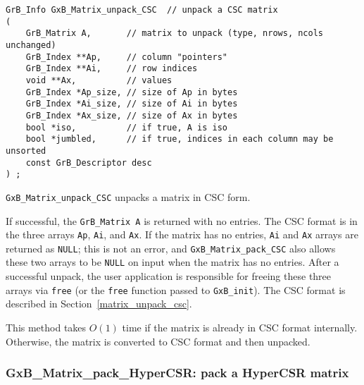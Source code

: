 \documentclass[12pt]{article}
\begin{document}
{\begin{mdframed}[userdefinedwidth=6in]
{\footnotesize
\begin{verbatim}
GrB_Info GxB_Matrix_unpack_CSC  // unpack a CSC matrix
(
    GrB_Matrix A,       // matrix to unpack (type, nrows, ncols unchanged)
    GrB_Index **Ap,     // column "pointers"
    GrB_Index **Ai,     // row indices
    void **Ax,          // values
    GrB_Index *Ap_size, // size of Ap in bytes
    GrB_Index *Ai_size, // size of Ai in bytes
    GrB_Index *Ax_size, // size of Ax in bytes
    bool *iso,          // if true, A is iso
    bool *jumbled,      // if true, indices in each column may be unsorted
    const GrB_Descriptor desc
) ;
\end{verbatim}
} \end{mdframed}

\verb'GxB_Matrix_unpack_CSC' unpacks a matrix in CSC form.

If successful, the \verb'GrB_Matrix A' is returned with no entries.
The CSC format is in the three arrays
\verb'Ap', \verb'Ai', and \verb'Ax'.  If the matrix has no entries, \verb'Ai'
and \verb'Ax' arrays are returned as \verb'NULL'; this is not an error, and
\verb'GxB_Matrix_pack_CSC' also allows these two arrays to be \verb'NULL' on
input when the matrix has no entries.  After a successful unpack, the user
application is responsible for freeing these three arrays via \verb'free' (or
the \verb'free' function passed to \verb'GxB_init').  The CSC format is
described in Section~\ref{matrix_unpack_csc}.

This method takes $O(1)$ time if the matrix is already in CSC format
internally.  Otherwise, the matrix is converted to CSC format and then
unpacked.


\newpage
\subsubsection{{\sf GxB\_Matrix\_pack\_HyperCSR:} pack a HyperCSR matrix}
\label{matrix_pack_hypercsr}

}
\end{document}
